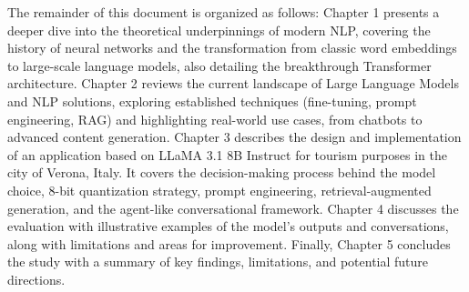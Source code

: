 
The remainder of this document is organized as follows: Chapter 1 presents a deeper dive into the theoretical underpinnings of modern NLP, covering the history of neural networks and the transformation from classic word embeddings to large-scale language models, also detailing the breakthrough Transformer architecture.
Chapter 2 reviews the current landscape of Large Language Models and NLP solutions, exploring established techniques (fine-tuning, prompt engineering, RAG) and highlighting real-world use cases, from chatbots to advanced content generation.
Chapter 3 describes the design and implementation of an application based on LLaMA 3.1 8B Instruct for tourism purposes in the city of Verona, Italy. It covers the decision-making process behind the model choice, 8-bit quantization strategy, prompt engineering, retrieval-augmented generation, and the agent-like conversational framework.
Chapter 4 discusses the evaluation with illustrative examples of the model’s outputs and conversations, along with limitations and areas for improvement.
Finally, Chapter 5 concludes the study with a summary of key findings, limitations, and potential future directions.